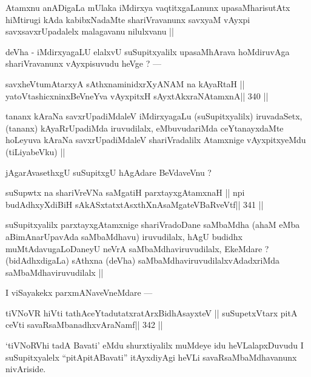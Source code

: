 \begin{artha}
Atamxnu anADigaLa mUlaka iMdirxya vaqtitxgaLanunx upasaMharisutAtx hiMtirugi kAda kabibxNadaMte shariVravanunx savxyaM vAyxpi savxsavxrUpadalelx malagavanu nilulxvanu ||
\end{artha}

\begin{artha}
deVha - iMdirxyagaLU elalxvU suSupitxyalilx upasaMhArava hoMdiruvAga shariVravanunx vAyxpisuvudu heVge ? ---
\end{artha}

\begin{shl}
savxheVtumAtarxyA sAthxnaminidxrXyANAM na kAyaRtaH ||
yatoV\s tashicxninxBeVneYva vAyxpitxH sAyxtAkxraNAtamxnA\hfill || 340 ||
\end{shl}

\begin{artha}
tananx kAraNa savxrUpadiMdaleV iMdirxyagaLu (suSupitxyalilx) iruvadaSetx, (tananx) kAyaRrUpadiMda iruvudilalx, eMbuvudariMda ceYtanayxdaMte hoLeyuva kAraNa savxrUpadiMdaleV shariVradalilx Atamxnige vAyxpitxyeMdu (tiLiyabeVku) ||
\end{artha}

\begin{artha}
jAgarAvasethxgU suSupitxgU hAgAdare BeVdaveVnu ?
\end{artha}

\begin{shl}
suSupwtx na shariVreVNa saMgatiH parxtayxgAtamxnaH ||
npi budAdhxyXdiBiH sAkASxtatxtAsxthXnAsaMgateVBaRveVtf\hfill || 341 ||
\end{shl}

\begin{artha}
suSupitxyalilx parxtayxgAtamxnige shariVradoDane saMbaMdha (ahaM eMba aBimAnarUpavAda saMbaMdhavu) iruvudilalx, hAgU budidhx muMtAdavugaLoDaneyU neVrA saMbaMdhaviruvudilalx, EkeMdare ? (bidAdhxdigaLa) sAthxna (deVha) saMbaMdhaviruvudilalxvAdadxriMda saMbaMdhaviruvudilalx ||
\end{artha}

\begin{artha}
I viSayakekx parxmANaveVneMdare ---
\end{artha}

\begin{shl}
tiVNoVR hiVti tathAceYtadutatxratArxBidhAsayxteV ||
suSupetxV\s tarx pitA ceVti savaRsaMbanadhxvAraNamf\hfill || 342 ||
\end{shl}

\begin{artha}
`tiVNoRVhi tadA Bavati' eMdu shurxtiyalilx muMdeye idu heVLalapxDuvudu I suSupitxyalelx ``pitA\s pitABavati'' itAyxdiyAgi heVLi savaRsaMbaMdhavanunx nivAriside.
\end{artha}

